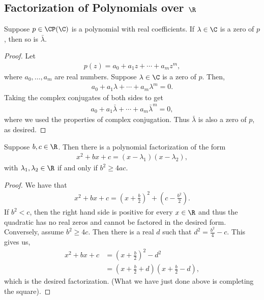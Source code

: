 \documentclass{article}
\begin{document}
\subsection{Factorization of Polynomials over $\R$}
\begin{prop}\label{prop:conjugate_zeros}
  Suppose $p \in \CP(\C)$ is a polynomial with real coefficients. If $\lambda \in \C$ is a zero of $p$, then so is $\bar{\lambda}$.
\end{prop}
\begin{proof}
  Let
  \begin{align*}
    p(z) = a_0 + a_1z + \cdots + a_mz^m,
  \end{align*}
  where $a_0, \dots, a_m$ are real numbers. Suppose $\lambda \in \C$ is a zero of $p$. Then,
  \begin{align*}
    a_0 + a_1\lambda + \cdots + a_m\lambda^m = 0.
  \end{align*}
  Taking the complex conjugates of both sides to get
  \begin{align*}
    a_0 + a_1\bar{\lambda} + \cdots + a_m\bar{\lambda}^m = 0,
  \end{align*}
  where we used the properties of complex conjugation. Thus $\bar{\lambda}$ is also a zero of $p$, as desired.
\end{proof}
\begin{prop}
  Suppose $b, c \in \R$. Then there is a polynomial factorization of the form
  \begin{align*}
    x^2 + bx + c = (x - \lambda_1)(x - \lambda_2),
  \end{align*}
  with $\lambda_1, \lambda_2 \in \R$ if and only if $b^2 \geq 4ac$.
\end{prop}
\begin{proof}
  We have that 
  \begin{align*}
    x^2 + bx + c = (x + \frac{b}{2})^2 + (c - \frac{b^2}{2}).
  \end{align*}
  If $b^2 < c$, then the right hand side is positive for every $x \in \R$ and thus the quadratic has no real zeros and cannot be factored in the desired form. Conversely, assume $b^2 \geq
  4c$. Then there is a real $d$ such that $d^2 = \frac{b^2}{4} - c$. This gives us,
  \begin{align*}
    x^2 + bx + c & = (x + \frac{b}{2})^2 - d^2 \\
    & = (x + \frac{b}{2} + d)(x + \frac{b}{2} - d),
  \end{align*}
  which is the desired factorization. (What we have just done above is completing the square).
\end{proof}
\end{document}
